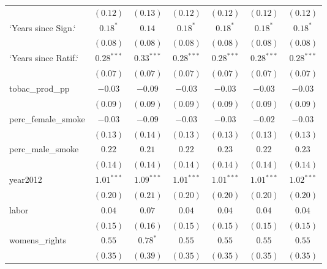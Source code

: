 \begin{table}[!h]
\begin{center}
\begin{tabular}{l c c c c c c }
                        & $(0.12)$     & $(0.13)$     & $(0.12)$     & $(0.12)$     & $(0.12)$     & $(0.12)$     \\
`Years since Sign.`     & $0.18^{*}$   & $0.14$       & $0.18^{*}$   & $0.18^{*}$   & $0.18^{*}$   & $0.18^{*}$   \\
                        & $(0.08)$     & $(0.08)$     & $(0.08)$     & $(0.08)$     & $(0.08)$     & $(0.08)$     \\
`Years since Ratif.`    & $0.28^{***}$ & $0.33^{***}$ & $0.28^{***}$ & $0.28^{***}$ & $0.28^{***}$ & $0.28^{***}$ \\
                        & $(0.07)$     & $(0.07)$     & $(0.07)$     & $(0.07)$     & $(0.07)$     & $(0.07)$     \\
tobac\_prod\_pp         & $-0.03$      & $-0.09$      & $-0.03$      & $-0.03$      & $-0.03$      & $-0.03$      \\
                        & $(0.09)$     & $(0.09)$     & $(0.09)$     & $(0.09)$     & $(0.09)$     & $(0.09)$     \\
perc\_female\_smoke     & $-0.03$      & $-0.09$      & $-0.03$      & $-0.03$      & $-0.02$      & $-0.03$      \\
                        & $(0.13)$     & $(0.14)$     & $(0.13)$     & $(0.13)$     & $(0.13)$     & $(0.13)$     \\
perc\_male\_smoke       & $0.22$       & $0.21$       & $0.22$       & $0.23$       & $0.22$       & $0.23$       \\
                        & $(0.14)$     & $(0.14)$     & $(0.14)$     & $(0.14)$     & $(0.14)$     & $(0.14)$     \\
year2012                & $1.01^{***}$ & $1.09^{***}$ & $1.01^{***}$ & $1.01^{***}$ & $1.01^{***}$ & $1.02^{***}$ \\
                        & $(0.20)$     & $(0.21)$     & $(0.20)$     & $(0.20)$     & $(0.20)$     & $(0.20)$     \\
labor                   & $0.04$       & $0.07$       & $0.04$       & $0.04$       & $0.04$       & $0.04$       \\
                        & $(0.15)$     & $(0.16)$     & $(0.15)$     & $(0.15)$     & $(0.15)$     & $(0.15)$     \\
womens\_rights          & $0.55$       & $0.78^{*}$   & $0.55$       & $0.55$       & $0.55$       & $0.55$       \\
                        & $(0.35)$     & $(0.39)$     & $(0.35)$     & $(0.35)$     & $(0.35)$     & $(0.35)$     \\

\end{tabular}
\end{center}
\end{table}
